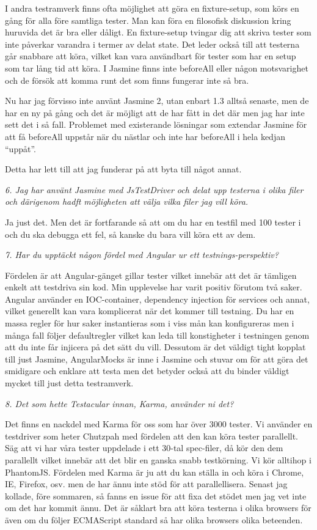 \documentclass[11pt]{article}
\begin{document}
I andra testramverk finns ofta möjlighet att göra en fixture-setup, som körs en gång för alla före samtliga tester. Man kan föra en filosofisk diskussion kring huruvida det är bra eller dåligt. En fixture-setup tvingar dig att skriva tester som inte påverkar varandra i termer av delat state. Det leder också till att testerna går snabbare att köra, vilket kan vara användbart för tester som har en setup som tar lång tid att köra. I Jasmine finns inte beforeAll eller någon motsvarighet och de försök att komma runt det som finns fungerar inte så bra.

Nu har jag förvisso inte använt Jasmine 2, utan enbart 1.3 alltså senaste, men de har en ny på gång och det är möjligt att de har fått in det där men jag har inte sett det i så fall. Problemet med existerande lösningar som extendar Jasmine för att få beforeAll uppstår när du nästlar och inte har beforeAll i hela kedjan ``uppåt''.

Detta har lett till att jag funderar på att byta till något annat.

\emph{6. Jag har använt Jasmine med JsTestDriver och delat upp testerna i olika filer och därigenom hadft möjligheten att välja vilka filer jag vill köra.}

Ja just det. Men det är fortfarande så att om du har en testfil med 100 tester i och du ska debugga ett fel, så kanske du bara vill köra ett av dem.

\emph{7. Har du upptäckt någon fördel med Angular ur ett testnings-perspektiv?}

Fördelen är att Angular-gänget gillar tester vilket innebär att det är tämligen enkelt att testdriva sin kod. Min upplevelse har varit positiv förutom två saker. Angular använder en IOC-container, dependency injection för services och annat, vilket generellt kan vara komplicerat när det kommer till testning. Du har en massa regler för hur saker instantieras som i viss mån kan konfigureras men i många fall följer defaultregler vilket kan leda till konstigheter i testningen genom att du inte får injicera på det sätt du vill. Dessutom är det väldigt tight kopplat till just Jasmine, AngularMocks är inne i Jasmine och stuvar om för att göra det smidigare och enklare att testa men det betyder också att du binder väldigt mycket till just detta testramverk.

\emph{8. Det som hette Testacular innan, Karma, använder ni det?}

Det finns en nackdel med Karma för oss som har över 3000 tester. Vi använder en testdriver som heter Chutzpah med fördelen att den kan köra tester parallellt. Säg att vi har våra tester uppdelade i ett 30-tal spec-filer, då kör den dem parallellt vilket innebär att det blir en ganska snabb testkörning. Vi kör alltihop i PhantomJS. Fördelen med Karma är ju att du kan ställa in och köra i Chrome, IE, Firefox, osv. men de har ännu inte stöd för att parallellisera. Senast jag kollade, före sommaren, så fanns en issue för att fixa det stödet men jag vet inte om det har kommit ännu. Det är såklart bra att köra testerna i olika browsers för även om du följer ECMAScript standard så har olika browsers olika beteenden.
\end{document}
